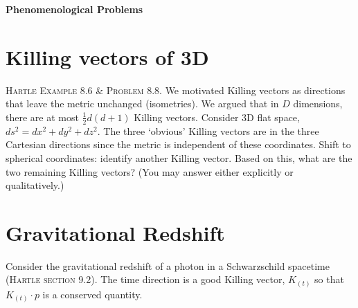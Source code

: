 \documentclass[12pt]{article}
\numberwithin{equation}{section}    %
\begin{document}
%


%


\vspace{2em}
{\Large\textbf{\textsf{Phenomenological Problems}}}

\section{Killing vectors of 3D}

\textsc{Hartle Example 8.6 \& Problem 8.8.} We motivated Killing vectors as directions that leave the metric unchanged (isometries). We argued that in $D$ dimensions, there are at most $\frac 12 d(d+1)$ Killing vectors. Consider 3D flat space, $ds^2 = dx^2 + dy^2 + dz^2$. The three `obvious' Killing vectors are in the three Cartesian directions since the metric is independent of these coordinates. Shift to spherical coordinates: identify another Killing vector. Based on this, what are the two remaining Killing vectors? (You may answer either explicitly or qualitatively.)




\section{Gravitational Redshift}

Consider the gravitational redshift of a photon in a Schwarzschild spacetime (\textsc{Hartle section 9.2}). The time direction is a good Killing vector, $K_{(t)}$ so that $K_{(t)}\cdot p$ is a conserved quantity. 
\end{document}
